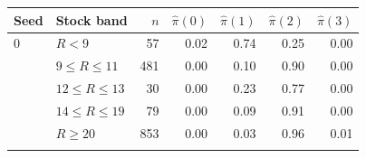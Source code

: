 \begin{tabular}{llrrrrr}
\toprule
Seed & Stock band & $n$ & $\hat\pi(0)$ & $\hat\pi(1)$ & $\hat\pi(2)$ & $\hat\pi(3)$ \\
\midrule
0 & $R<9$ & 57 & 0.02 & 0.74 & 0.25 & 0.00 \\
 & $9\le R\le 11$ & 481 & 0.00 & 0.10 & 0.90 & 0.00 \\
 & $12\le R\le 13$ & 30 & 0.00 & 0.23 & 0.77 & 0.00 \\
 & $14\le R\le 19$ & 79 & 0.00 & 0.09 & 0.91 & 0.00 \\
 & $R\ge 20$ & 853 & 0.00 & 0.03 & 0.96 & 0.01 \\
\addlinespace
\bottomrule
\end{tabular}
